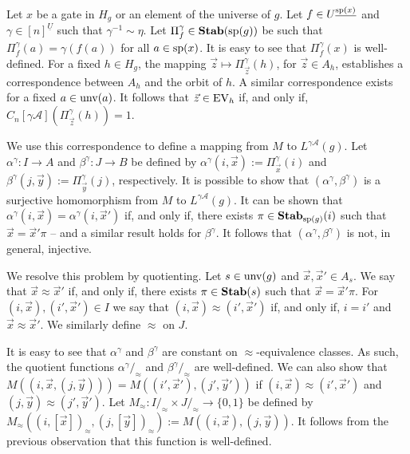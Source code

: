 \documentclass[a4paper,UKenglish]{lipics-v2018}
\begin{document}
Let $x$ be a gate in $H_g$ or an element of the universe of $g$. Let $f \in
U^{\underline{\text{sp}(x)}}$ and $\gamma \in [n]^{\underline{U}}$ such that
$\gamma^{-1} \sim \eta$. Let $\Pi^{\gamma}_{f} \in \text{\textbf{Stab}} (\text{sp} (g))$ be such that
$\Pi^{\gamma}_f (a) = \gamma (f(a))$ for all $a \in \text{sp}(x)$. It is easy to
see that $\Pi^{\gamma}_f(x)$ is well-defined. For a fixed $h \in H_g$, the
mapping $\vec{z} \mapsto \Pi^{\gamma}_{\vec{z}}(h)$, for $\vec{z} \in A_h$,
establishes a correspondence between $A_h$ and the orbit of $h$. A similar
correspondence exists for a fixed $a \in \text{unv}(a)$. It follows that $\vec{z}
\in \text{EV}_h$ if, and only if, $C_n[\gamma \mathcal{A}](\Pi^{\gamma}_{\vec{z}}(h))
= 1$. \cite{DW-arxiv}

We use this correspondence to define a mapping from $M$ to $L^{\gamma
  \mathcal{A}}(g)$. Let $\alpha^{\gamma}: I \rightarrow A$ and $\beta^{\gamma}:
J \rightarrow B$ be defined by $\alpha^{\gamma} (i, \vec{x}) :=
\Pi^{\gamma}_{\vec{x}}(i)$ and $\beta^{\gamma} (j, \vec{y}) :=
\Pi^{\gamma}_{\vec{y}}(j)$, respectively. It is possible to show that
$(\alpha^{\gamma}, \beta^{\gamma})$ is a surjective homomorphism from $M$ to
$L^{\gamma\mathcal{A}}(g)$. It can be shown that $\alpha^{\gamma}(i, \vec{x}) =
\alpha^{\gamma}(i, \vec{x}')$ if, and only if, there exists $\pi \in
\text{\textbf{Stab}}_{\text{sp}(g)}(i)$ such that $\vec{x} = \vec{x}' \pi$ -- and a similar result
holds for $\beta^{\gamma}$. It follows that $(\alpha^{\gamma}, \beta^{\gamma})$
is not, in general, injective.

We resolve this problem by quotienting. Let $s \in \text{unv}(g)$ and $\vec{x},
\vec{x}' \in A_s$. We say that $\vec{x} \approx \vec{x}'$ if, and only if, there
exists $\pi \in \text{\textbf{Stab}}(s)$ such that $\vec{x} = \vec{x}' \pi$. For $(i, \vec{x}),
(i', \vec{x}') \in I$ we say that $(i, \vec{x}) \approx (i', \vec{x}')$ if, and
only if, $i = i'$ and $\vec{x} \approx \vec{x}'$. We similarly define $\approx$
on $J$.

It is easy to see that $\alpha^{\gamma}$ and $\beta^{\gamma}$ are constant on
$\approx$-equivalence classes. As such, the quotient functions $\alpha^\gamma
/_\approx$ and $\beta^{\gamma} /_\approx$ are well-defined. We can also show
that $M((i, \vec{x}, (j, \vec{y}))) = M((i',\vec{x}'), (j', \vec{y}'))$ if $(i,
\vec{x}) \approx (i', \vec{x}')$ and $(j, \vec{y}) \approx (j', \vec{y}')$. Let
$M_{\approx} : I /_{\approx} \times J /_\approx \rightarrow \{0,1\}$ be defined
by $M_\approx ((i, [\vec{x}])_\approx, (j, [\vec{y}])_\approx) := M((i,\vec{x}),
(j, \vec{y}))$. It follows from the previous observation that this function is
well-defined.
\end{document}
